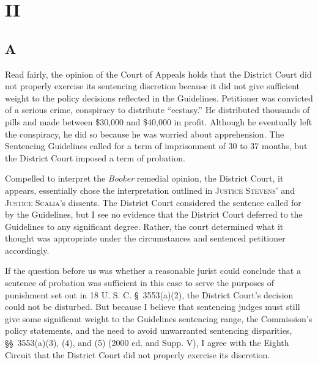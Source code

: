 \section{II}

\subsection{A}

  Read fairly, the opinion of the Court of Appeals holds that the
District Court did not properly exercise its sentencing discretion
because it did not give sufficient weight to the policy decisions
reflected in the Guidelines. Petitioner was convicted of a serious
crime, conspiracy to distribute ``ecstasy.'' He distributed thousands
of pills and made between \$30,000 and \$40,000 in profit. Although
he eventually left the conspiracy, he did so because he was worried
about apprehension. The Sentencing Guidelines called for a term of
imprisonment of 30 to 37 months, but the District Court imposed a term
of probation.

  Compelled to interpret the \emph{Booker} remedial opinion, the District
Court, it appears, essentially chose the interpretation outlined in
\textsc{Justice Stevens}' and \textsc{Justice Scalia}'s dissents. The District
Court considered the sentence called for by the Guidelines, but I see
no evidence that the District Court deferred to the Guidelines to
any significant degree. Rather, the court determined what it thought
was appropriate under the circumstances and sentenced petitioner
accordingly.

  If the question before us was whether a reasonable jurist could
conclude that a sentence of probation was sufficient in \newpage 
this case to serve the purposes of punishment set out in 18 U. S.
C. \S~3553(a)(2), the District Court's decision could not be
disturbed. But because I believe that sentencing judges must still
give some significant weight to the Guidelines sentencing range, the
Commission's policy statements, and the need to avoid unwarranted
sentencing disparities, \S\S~3553(a)(3), (4), and (5) (2000 ed. and
Supp. V), I agree with the Eighth Circuit that the District Court did
not properly exercise its discretion.

